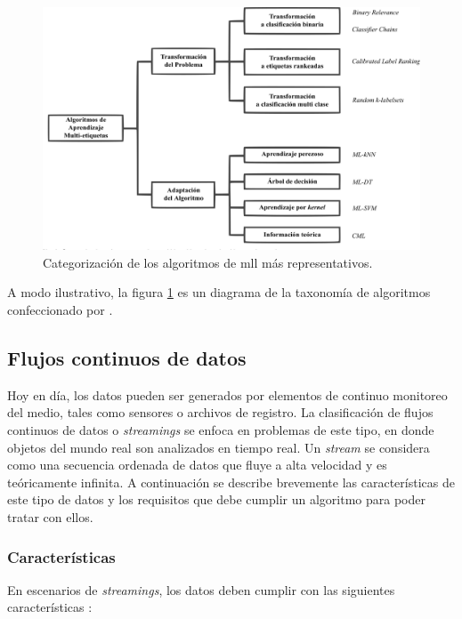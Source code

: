 \begin{figure}
   \includegraphics[width=\linewidth]{figures/algorithm_taxonomy.png}
   \caption{Categorización de los algoritmos de \acrshort{mll} más
   representativos.}
   \label{fig:algorithm_taxonomy} 
\end{figure}

A modo ilustrativo, la figura \ref{fig:algorithm_taxonomy} es un diagrama de la
taxonomía de algoritmos confeccionado por \citeauthor{zhang_review_2014} \cite
{zhang_review_2014}.

\subsection{Flujos continuos de datos}
\label{intro_streams}

Hoy en día, los datos pueden ser generados por elementos de continuo monitoreo
del medio, tales como sensores o archivos de registro.  La clasificación de
flujos continuos de datos o \textit{streamings} se enfoca en problemas de este
tipo, en donde objetos del mundo real son analizados en tiempo real. Un
\textit{stream} se considera como una secuencia ordenada de datos que fluye a
alta velocidad y es teóricamente infinita. A continuación se describe brevemente
las características de este tipo de datos y los requisitos que debe cumplir un
algoritmo para poder tratar con ellos.

\subsubsection{Características}
\label{stream_caracteristicas}

En escenarios de \textit{streamings}, los datos deben cumplir con las siguientes
características \cite {gama_knowledge_2010}: 

